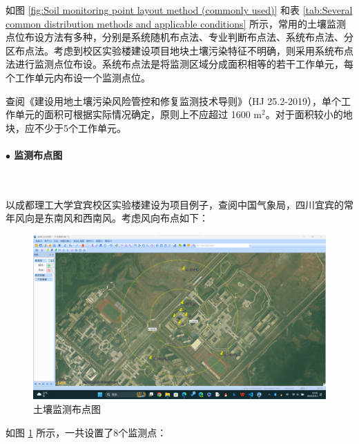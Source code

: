 如图 \ref{fig:Soil monitoring point layout method (commonly used)} 和表 \ref{tab:Several common distribution methods and applicable conditions} 所示，常用的土壤监测点位布设方法有多种，分别是系统随机布点法、专业判断布点法、系统布点法、分区布点法。考虑到校区实验楼建设项目地块土壤污染特征不明确，则采用系统布点法进行监测点位布设。系统布点法是将监测区域分成面积相等的若干工作单元，每个工作单元内布设一个监测点位。

查阅《建设用地土壤污染风险管控和修复监测技术导则》（HJ 25.2-2019），单个工作单元的面积可根据实际情况确定，原则上不应超过 1600 m$^2$。对于面积较小的地块，应不少于5个工作单元。

\paragraph{$\bullet $ 监测布点图}~{}\par

以成都理工大学宜宾校区实验楼建设为项目例子，查阅中国气象局，四川宜宾的常年风向是东南风和西南风。考虑风向布点如下：
\begin{figure}[H]
    \centering
    \includegraphics[width=\textwidth]{figures/Soil monitoring dot map.png}
    \caption{土壤监测布点图}
    \label{fig:Soil monitoring dot map}
\end{figure}

如图 \ref{fig:Soil monitoring dot map} 所示，一共设置了8个监测点：

